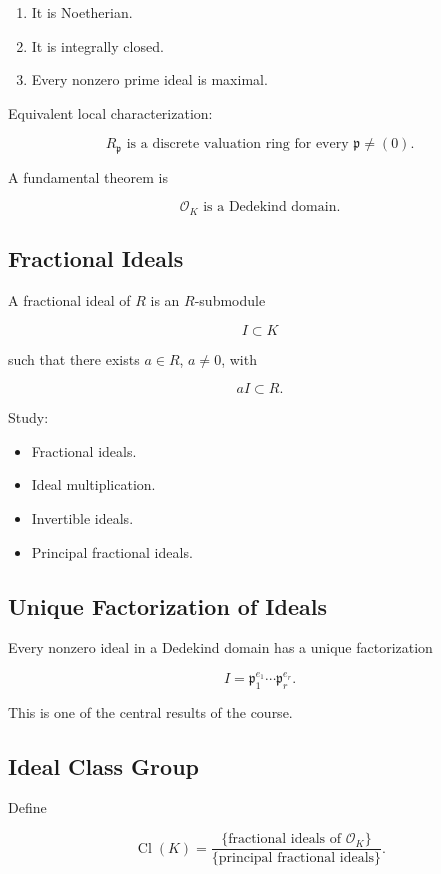\documentclass[11pt]{article}
\begin{document}
\begin{enumerate}
    \item It is Noetherian.
    \item It is integrally closed.
    \item Every nonzero prime ideal is maximal.
\end{enumerate}

Equivalent local characterization:

\[
R_{\mathfrak p}
\text{ is a discrete valuation ring for every }
\mathfrak p\neq(0).
\]

A fundamental theorem is

\[
\boxed{\mathcal{O}_K \text{ is a Dedekind domain}.}
\]

\subsection{Fractional Ideals}

A fractional ideal of $R$ is an $R$-submodule

\[
I\subset K
\]

such that there exists $a\in R$, $a\neq0$, with

\[
aI\subset R.
\]

Study:

\begin{itemize}
    \item Fractional ideals.
    \item Ideal multiplication.
    \item Invertible ideals.
    \item Principal fractional ideals.
\end{itemize}

\subsection{Unique Factorization of Ideals}

Every nonzero ideal in a Dedekind domain has a unique factorization

\[
I
=
\mathfrak{p}_1^{e_1}
\cdots
\mathfrak{p}_r^{e_r}.
\]

This is one of the central results of the course.

\subsection{Ideal Class Group}

Define

\[
\operatorname{Cl}(K)
=
\frac{\{\text{fractional ideals of }\mathcal{O}_K\}}
{\{\text{principal fractional ideals}\}}.
\]
\end{document}
